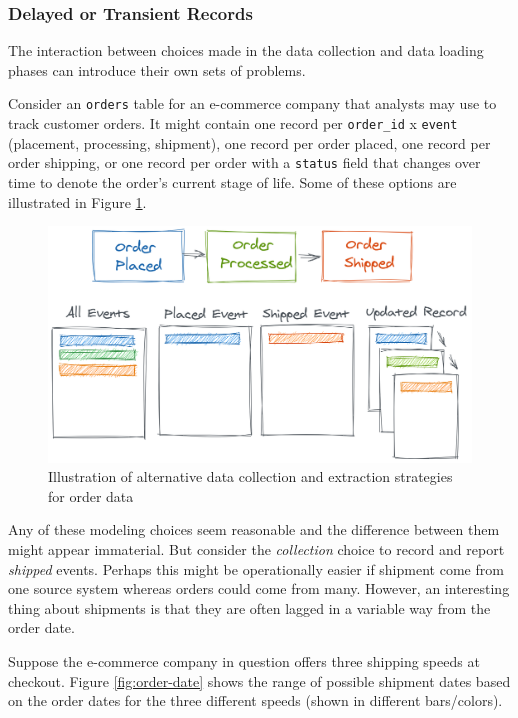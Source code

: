 \documentclass[
]{krantz}
\begin{document}
\hypertarget{delayed-or-transient-records}{%
\subsubsection{Delayed or Transient Records}\label{delayed-or-transient-records}}

The interaction between choices made in the data collection and data loading phases can introduce their own sets of problems.

Consider an \texttt{orders} table for an e-commerce company that analysts may use to track customer orders.
It might contain one record per \texttt{order\_id} x \texttt{event} (placement, processing, shipment), one record per order placed, one record per order shipping, or one record per order with a \texttt{status} field that changes over time to denote the order's current stage of life. Some of these options are illustrated in Figure \ref{fig:order-log}.

\begin{figure}

{\centering \includegraphics[width=0.9\linewidth]{figures/data-dall/order-log} 

}

\caption{Illustration of alternative data collection and extraction strategies for order data}\label{fig:order-log}
\end{figure}

Any of these modeling choices seem reasonable and the difference between them might appear immaterial.
But consider the \emph{collection} choice to record and report \emph{shipped} events.
Perhaps this might be operationally easier if shipment come from one source system whereas orders could come from many.
However, an interesting thing about shipments is that they are often lagged in a variable way from the order date.

Suppose the e-commerce company in question offers three shipping speeds at checkout. Figure \ref{fig:order-date} shows the range of possible shipment dates based on the order dates for the three different speeds (shown in different bars/colors).
\end{document}
